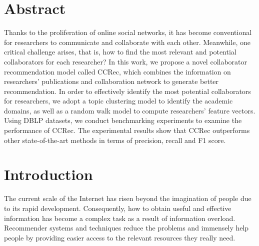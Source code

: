 \documentclass[10pt,letterpaper]{article}
\begin{document}
\section*{Abstract}
Thanks to the proliferation of online social networks, it has become conventional for researchers to communicate and collaborate with each other. Meanwhile, one critical challenge arises, that is, how to find the most relevant and potential collaborators for each researcher? In this work, we propose a novel collaborator recommendation model called CCRec, which combines the information on researchers' publications and collaboration network to generate better recommendation. In order to effectively identify the most potential collaborators for researchers, we adopt a topic clustering model to identify the academic domains, as well as a random walk model to compute researchers' feature vectors. Using DBLP datasets, we conduct benchmarking experiments to examine the performance of CCRec. The experimental results show that CCRec outperforms other state-of-the-art methods in terms of precision, recall and F1 score.



\linenumbers

\section*{Introduction}
The current scale of the Internet has risen beyond the imagination of people due to its rapid development. Consequently, how to obtain useful and effective information has become a complex task as a result of information overload. Recommender systems and techniques reduce the problems and immensely help people by providing easier access to the relevant resources they really need.
\end{document}
